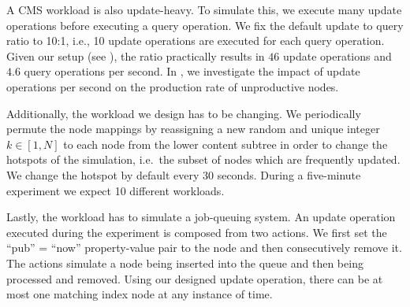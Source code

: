 \documentclass[abstracton,12pt]{scrartcl}
\theoremstyle{definition}
\begin{document}
A CMS workload is also update-heavy. To simulate this, we execute many update 
operations before
executing a query operation. We fix the default update to query ratio to 10:1, i.e., 
10 update operations are executed for each query operation. 
Given our setup (see ), the ratio practically results in $46$ 
update operations and $4.6$ query operations per second.
In , we investigate the impact of update operations per second
on the production rate of unproductive nodes.

Additionally, the workload we design has to be changing. We periodically permute 
the node mappings by reassigning a new random and unique integer $k \in [1,N]$ to each
node from the lower content subtree in order to change the hotspots of the simulation,
i.e.\ the subset of nodes which are frequently updated.
We change the hotspot by default every 30 seconds. During a five-minute
experiment we expect 10 different workloads.

Lastly, the workload has to simulate a job-queuing system. An update operation
executed during the experiment is composed from two actions. We first set the
``pub'' = ``now'' property-value pair to the node and then consecutively remove
it. The actions simulate a node being inserted into the queue and then being
processed and removed. Using our designed update operation, there can be at most
one matching index node at any instance of time.
\end{document}

